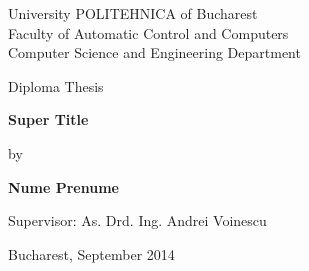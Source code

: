 

\pagestyle{empty}
\sffamily

\noindent
\begin{center}
    \Large
    University POLITEHNICA of Bucharest\\
    Faculty of Automatic Control and Computers \\
    Computer Science and Engineering Department \\
\end{center}

\vfill\vfill
\begin{center}
    \Large
    Diploma Thesis\\
\end{center}

\vfill
\begin{center}
	\HUGE\bfseries
	Super Title\\
\vfill
	\large
	
\end{center}

\vfill
\begin{center}
    \Large
    by
\end{center}

\vfill
\begin{center}
    \huge\bfseries
    Nume Prenume
\end{center}

\vfill\vfill\vfill
\begin{center}
	\Large
	Supervisor: As. Drd. Ing. Andrei Voinescu\\
\end{center}

\vfill
\begin{center}
\large
    Bucharest, September 2014
\end{center}

\cleardoublepage

\pagestyle{headings}
\tableofcontents

